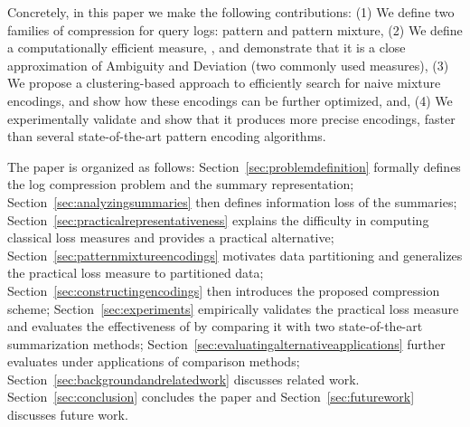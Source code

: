 Concretely, in this paper we make the following contributions:
(1) We define two families of compression for query logs: pattern and pattern mixture, 
(2) We define a computationally efficient measure, \errorname, and demonstrate that it is a close approximation of Ambiguity and Deviation (two commonly used measures),
(3) We propose a clustering-based approach to efficiently search for naive mixture encodings, and show how these encodings can be further optimized, and, 
(4) We experimentally validate \systemnameone and show that it produces more precise encodings, faster than several state-of-the-art pattern encoding algorithms.

The paper is organized as follows: Section~\ref{sec:problemdefinition} formally defines the log compression problem and the summary representation;
Section~\ref{sec:analyzingsummaries} then defines information loss of the summaries;
Section~\ref{sec:practicalrepresentativeness} explains the difficulty in computing classical loss measures and provides a practical alternative;
Section~\ref{sec:patternmixtureencodings} motivates data partitioning and generalizes the practical loss measure to partitioned data;
Section~\ref{sec:constructingencodings} then introduces the proposed \systemnameone compression scheme;
Section~\ref{sec:experiments} empirically validates the practical loss measure and evaluates the effectiveness of \systemnameone by comparing it with two state-of-the-art summarization methods;
Section~\ref{sec:evaluatingalternativeapplications} further evaluates \systemnameone under applications of comparison methods;
Section~\ref{sec:backgroundandrelatedwork} discusses related work.
Section~\ref{sec:conclusion} concludes the paper and Section~\ref{sec:futurework} discusses future work.